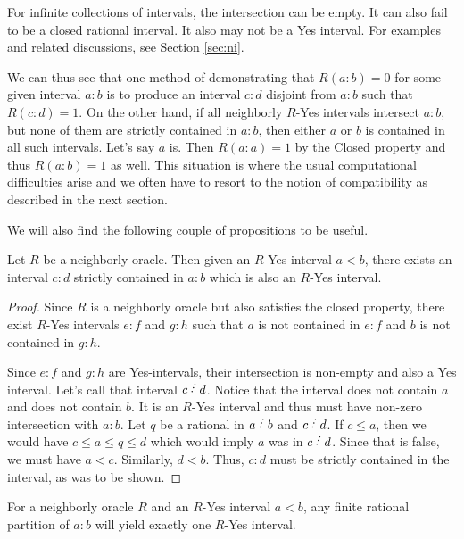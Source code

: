 \documentclass[12pt]{article}
\begin{document}
For infinite collections of intervals, the intersection can be empty. It can also fail to be a closed rational interval. It also may not be a Yes interval. For examples and related discussions, see Section \ref{sec:ni}. 

We can thus see that one method of demonstrating that $R(a:b)=0$ for some given interval $a:b$ is to produce an interval $c:d$ disjoint from $a:b$ such that $R(c:d)=1$. On the other hand, if all neighborly $R$-Yes intervals intersect $a:b$, but none of them are strictly contained in $a:b$, then either $a$ or $b$ is contained in all such intervals. Let's say $a$ is. Then $R(a:a)=1$ by the Closed property and thus $R(a:b)=1$ as well. This situation is where the usual computational difficulties arise and we often have to resort to the notion of compatibility as described in the next section. 

We will also find the following couple of propositions to be useful. 

\begin{proposition}\label{pr:subinter}
Let $R$ be a neighborly oracle. Then given an $R$-Yes interval $a\lt b$, there exists an interval $c:d$ strictly contained in $a:b$ which is also an $R$-Yes interval. 
\end{proposition}

\begin{proof}
Since $R$ is a neighborly oracle but also satisfies the closed property, there exist $R$-Yes intervals $e:f$ and $g:h$ such that $a$ is not contained in $e:f$ and $b$ is not contained in $g:h$. 

Since $e:f$ and $g:h$ are Yes-intervals, their intersection is non-empty and also a Yes interval. Let's call that interval $c\lte d$.  Notice that the interval does not contain $a$ and does not contain $b$. It is an $R$-Yes interval and thus must have non-zero intersection with $a:b$. Let $q$ be a rational in $a\lte b$ and $c \lte d$. If $c\leq a$, then we would have $c \leq a \leq q \leq d$ which would imply $a$ was in $c \lte d$. Since that is false, we must have $a < c$. Similarly, $d < b$. Thus, $c:d$ must be strictly contained in the interval, as was to be shown. 
\end{proof}

\begin{proposition}\label{pr:multi}
For a neighborly oracle $R$ and an $R$-Yes interval $a\lt b$, any finite rational partition of $a:b$ will yield exactly one $R$-Yes interval. 
\end{proposition}
\end{document}
